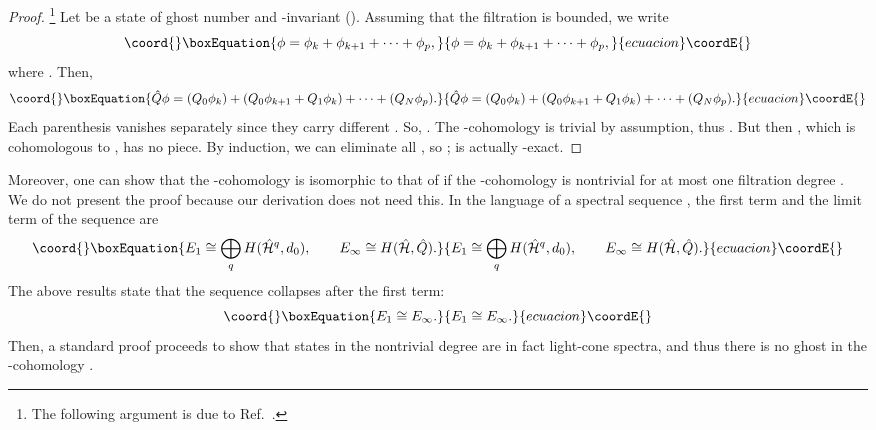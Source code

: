 \documentclass[a4paper,12pt]{article}
\providecommand{\hN}{\hat{N}^g}
\providecommand{\hQ}{\hat{Q}}
\begin{document}
\begin{proof}
\footnote{The following argument is due to Ref.~\cite{BMP}.}
Let \myHighlight{$ \phi $}\coordHE{} be a state of ghost number \myHighlight{$ \hN =n$}\coordHE{} and \myHighlight{$\hQ$}\coordHE{}-invariant
(\coordHE{}).
Assuming that the filtration is bounded, we write
\begin{equation}\coord{}\boxEquation{
\phi = \phi_{k} + \phi_{k+1} + \cdots + \phi_{p},
}{
\phi = \phi_{k} + \phi_{k+1} + \cdots + \phi_{p},
}{ecuacion}\coordE{}\end{equation}
where \coordHE{}.
Then,
\begin{equation}\coord{}\boxEquation{
\hQ \phi = (Q_{0} \phi_{k}) + (Q_{0} \phi_{k+1} + Q_{1} \phi_{k})
+  \cdots + (Q_N\phi_p).
}{
\hQ \phi = (Q_{0} \phi_{k}) + (Q_{0} \phi_{k+1} + Q_{1} \phi_{k})
+  \cdots + (Q_N\phi_p).
}{ecuacion}\coordE{}\end{equation}
Each parenthesis vanishes separately since they carry different \coordHE{}.
So, \coordHE{}.  The \coordHE{}-cohomology is trivial by
assumption, thus \coordHE{}.
But then \myHighlight{$ \phi
- \hQ \chi_{k} $}\coordHE{}, which is cohomologous to \myHighlight{$ \phi $}\coordHE{}, has no \coordHE{}
piece. By induction, we can eliminate all \coordHE{}, so \myHighlight{$ \phi = \hQ (
\chi_{k} + \ldots + \chi_{p} ) $}\coordHE{}; \myHighlight{$ \phi $}\coordHE{} is actually \myHighlight{$\hQ$}\coordHE{}-exact.
\end{proof}

Moreover, one can show that the \coordHE{}-cohomology is isomorphic to that of
\myHighlight{$\hQ$}\coordHE{} if the \coordHE{}-cohomology is nontrivial for at most one filtration degree
\cite{Big,BMP}. We do not present the proof because our derivation does not
need this.
In the language of a spectral sequence \cite{BT}, the first term and the
limit term of the sequence are
\begin{equation}\coord{}\boxEquation{
E_1 \cong \bigoplus_q H(\hat{\cal H}^q, d_0), \qquad E_\infty \cong
H(\hat{\cal H}, \hQ).
}{
E_1 \cong \bigoplus_q H(\hat{\cal H}^q, d_0), \qquad E_\infty \cong
H(\hat{\cal H}, \hQ).
}{ecuacion}\coordE{}\end{equation}
The above results state that the sequence collapses after the first term:
\begin{equation}\coord{}\boxEquation{
E_1 \cong E_\infty.
}{
E_1 \cong E_\infty.
}{ecuacion}\coordE{}\end{equation}
Then, a standard proof proceeds to show that states in the nontrivial degree are in fact light-cone spectra, and thus there is no ghost in the \myHighlight{$\hQ$}\coordHE{}-cohomology \cite{Big}.
\end{document}
